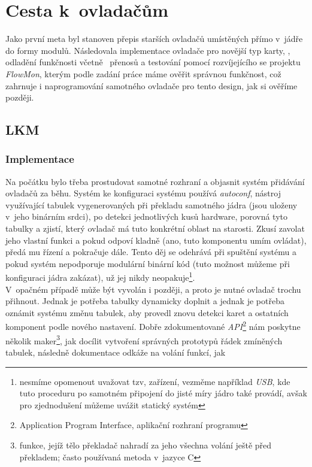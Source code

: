 \chapter{Cesta k~ovladačům}
  Jako první meta byl stanoven přepis starších ovladačů umístěných přímo
  v~jádře do formy modulů. Následovala implementace ovladače pro novější typ
  karty, \comx, odladění funkčnosti včetně \dma\ přenosů a testování pomocí
  rozvíjejícího se projektu \emph{FlowMon}, kterým podle zadání práce máme
  ověřit správnou funkčnost, což zahrnuje i naprogramování samotného ovladače
  pro tento design, jak si ověříme později.
  \section{LKM}
  \subsection{Implementace}
  Na počátku bylo třeba prostudovat samotné rozhraní a objasnit systém
  přidávání ovladačů za běhu.
  Systém ke konfiguraci systému používá \emph{autoconf}, nástroj
  využívající tabulek vygenerovaných při překladu samotného jádra (jsou
  uloženy v~jeho binárním srdci), po detekci jednotlivých kusů hardware,
  porovná tyto tabulky a
  zjistí, který ovladač má tuto konkrétní oblast na starosti. Zkusí zavolat
  jeho vlastní funkci a pokud odpoví kladně (ano, tuto komponentu umím
  ovládat), předá mu řízení a pokračuje dále. Tento děj se odehrává při
  spuštění systému a pokud systém nepodporuje modulární binární kód (tuto
  možnost můžeme při konfiguraci jádra zakázat), už jej nikdy
  neopakuje\footnote{nesmíme opomenout uvažovat tzv,  zařízení,
  vezměme například \emph{USB},
  kde tuto proceduru po samotném připojení do jisté míry jádro také
  provádí, avšak pro zjednodušení můžeme uvážit statický systém}. \\ \indent
  V~opačném případě může být vyvolán i později, a proto je nutné ovladač
  trochu přihnout. Jednak je
  potřeba tabulky dynamicky doplnit a jednak je potřeba oznámit systému změnu
  tabulek, aby provedl znovu detekci karet a ostatních komponent podle nového
  nastavení. Dobře zdokumentované \emph{API}\footnote{Application Program
  Interface,
  aplikační rozhraní programu} nám poskytne několik maker\footnote{funkce,
  jejíž tělo překladač nahradí za jeho všechna volání ještě před překladem;
  často
  používaná metoda v~jazyce C}, jak docílit vytvoření správných prototypů
  řádek zmíněných tabulek, následně dokumentace odkáže na volání funkcí, jak
